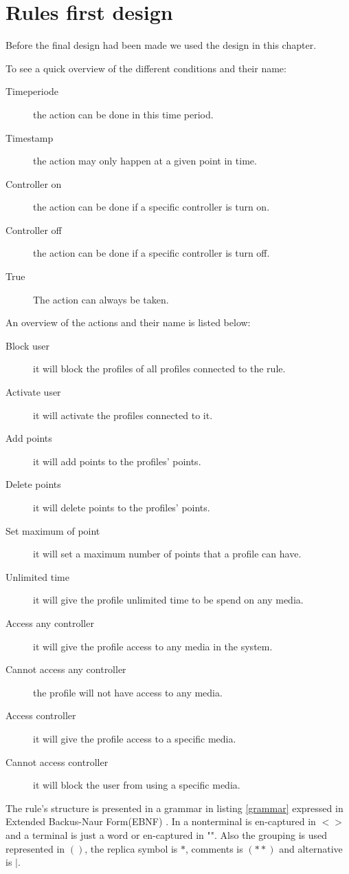\chapter{Rules first design}
\label{appendixFirstRuleDesign}
Before the final design had been made we used the design in this chapter.

To see a quick overview of the different conditions and their name:
\begin{description}
	\item[Timeperiode] the action can be done in this time period. 
	\item[Timestamp] the action may only happen at a given point in time. 
	\item[Controller on] the action can be done if a specific controller is turn on. 
	\item[Controller off] the action can be done if a specific controller is turn off. 
	\item[True] The action can always be taken.
\end{description}

An overview of the actions and their name is listed below:

\begin{description}
	\item[Block user] it will block the profiles of all profiles connected to the rule.
	\item[Activate user] it will activate the profiles connected to it. 
	\item[Add points] it will add points to the profiles' points.
	\item[Delete points]  it will delete points to the profiles' points.  
	\item[Set maximum of point] it will set a maximum number of points that a profile can have. 
	\item[Unlimited time] it will give the profile unlimited time to be spend on any media. 
	\item[Access any controller] it will give the profile access to any media in the system. 
	\item[Cannot access any controller] the profile will not have access to any media. 
	\item[Access controller] it will give the profile access to a specific media. 
	\item[Cannot access controller] it will block the user from using a specific media. 
\end{description}

The rule's structure is presented in a grammar in listing	\ref{grammar} expressed in Extended Backus-Naur Form(EBNF) \citep{CoPL}.
In a nonterminal is en-captured in $<>$ and a terminal is just a word or en-captured in "". 
Also the grouping is used represented in $()$, the replica symbol is $*$, comments is $(**)$ and alternative is $|$. 

